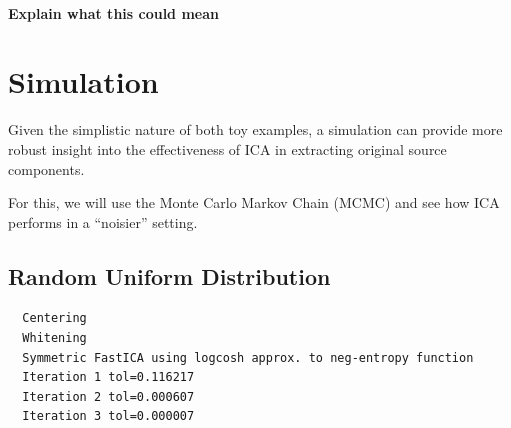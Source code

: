 \documentclass[12pt,twoside]{amherstthesis}
\begin{document}
  \paragraph{Explain what this could
  mean}\label{explain-what-this-could-mean}
  
  \section{Simulation}\label{simulation}
  
  Given the simplistic nature of both toy examples, a simulation can
  provide more robust insight into the effectiveness of ICA in extracting
  original source components.
  
  For this, we will use the Monte Carlo Markov Chain (MCMC) and see how
  ICA performs in a ``noisier'' setting.
  
  \subsection{Random Uniform
  Distribution}\label{random-uniform-distribution}
  
  \begin{Shaded}
  \begin{Highlighting}[]
  \StringTok{ }\NormalTok{, } \NormalTok{, } \NormalTok{, } \NormalTok{, }
                \NormalTok{, } \NormalTok{, } \NormalTok{, }
                \NormalTok{, } \NormalTok{)}
  \end{Highlighting}
  \end{Shaded}
  
  \begin{verbatim}
  Centering
  Whitening
  Symmetric FastICA using logcosh approx. to neg-entropy function
  Iteration 1 tol=0.116217
  Iteration 2 tol=0.000607
  Iteration 3 tol=0.000007
  \end{verbatim}
  
\end{document}
